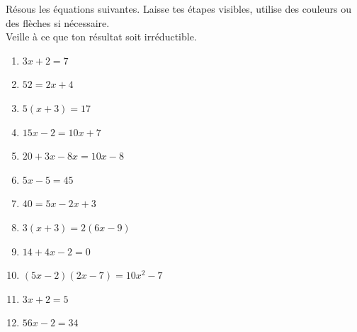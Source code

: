 %
%
    Résous les équations suivantes. Laisse tes étapes visibles, utilise des couleurs ou des flèches si nécessaire.\\ Veille à ce que ton résultat soit irréductible.
    \begin{enumerate}[cols=2, itemsep=1em]
        \item \(3x + 2 = 7\)
        \item \(52 = 2x + 4\)
        \item \(5(x+3)=17\)
        \item \(15x - 2 = 10x + 7\)
        \item \(20 + 3x - 8x = 10x - 8\)
        \item \(5x - 5 = 45\)
        \item \(40 = 5x - 2x + 3\)
        \item \(3(x+3)= 2(6x-9)\)
        \item \(14 + 4x - 2 = 0\)
        \item \(\left(5x - 2\right)\left(2x - 7\right) = 10x^2 - 7 \)
        \item \(3x + 2 = 5\)
        \item \(56 x - 2 = 34 \)
    \end{enumerate}
